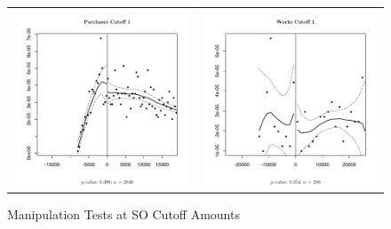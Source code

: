 \documentclass[11pt]{article}
\begin{document}
\begin{figure}[!htbp] \centering
  \caption{Manipulation Tests at SO Cutoff Amounts}\label{fig:manipulationtests}
  \begin{tabular}{cc}
  \includegraphics[scale = .45]{../plots/purchasesmanipulation1.pdf} &
  \includegraphics[scale = .45]{../plots/worksmanipulation1.pdf} \\

\end{tabular}
\end{figure}
\end{document}
